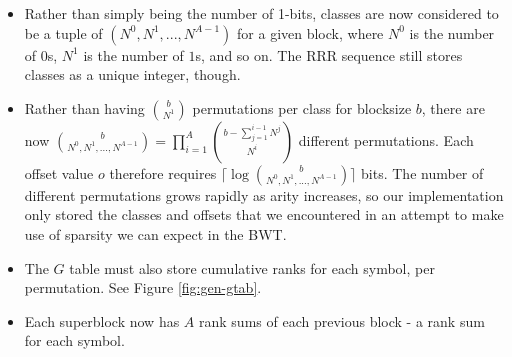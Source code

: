 \begin{itemize}
	\item
		Rather than simply being the number of 1-bits, classes are now 
		considered to be a tuple of $(N^0, N^1, ..., N^{A-1})$ for a given 
		block, where $N^0$ is the number of $0$s, $N^1$ is the number of $1$s, 
		and so on. The RRR sequence still stores classes as a unique integer, 
		though.

	\item
		Rather than having $b \choose N^1$ permutations per class for blocksize 
		$b$, there are now ${b \choose N^0, N^1,...,N^{A-1}} = 
		\prod_{i = 1}^{A} {{b - \sum_{j = 1}^{i - 1} N^j} \choose N^i}
		$ different permutations. Each offset value $o$ therefore requires 
		$\lceil\log {b \choose N^0, N^1,...,N^{A-1}}\rceil$ bits.
		The number of different permutations grows rapidly as arity increases, 
		so our implementation only stored the classes and offsets that we 
		encountered in an attempt to make use of sparsity we can expect in
		the BWT.

	\item
		The $G$ table must also store cumulative ranks for each symbol, per 
		permutation. See Figure \ref{fig:gen-gtab}.

	\item
		Each superblock now has $A$ rank sums of each previous block - a rank 
		sum for each symbol.
\end{itemize}
